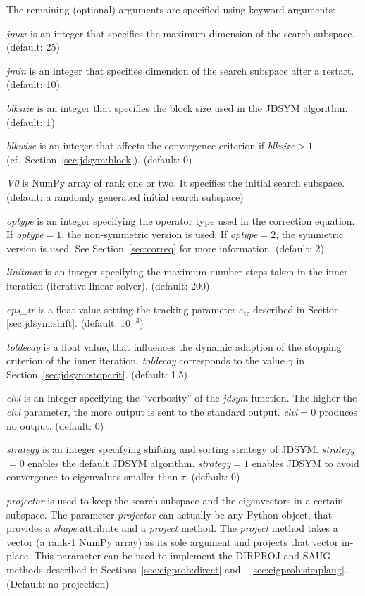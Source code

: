 \documentclass[a4paper]{article}
\newcommand{\epstr}{\ensuremath{\varepsilon_{\text{tr}}}}
\newenvironment{arglist} {\begin{list}{}{\setlength{\leftmargin}{4em}\setlength{\itemsep}{0cm}\setlength{\labelwidth}{3em}}}
  {\end{list}}
\begin{document}
\noindent The remaining (optional) arguments are specified using keyword
arguments:
\begin{arglist}
\item[\textit{jmax}] is an integer that specifies the maximum
  dimension of the search subspace. (default: 25)
\item[\textit{jmin}] is an integer that specifies dimension of the
  search subspace after a restart. (default: 10)
\item[\textit{blksize}] is an integer that specifies the block size
  used in the JDSYM algorithm. (default: 1)
\item[\textit{blkwise}] is an integer that affects the convergence
  criterion if \textit{blksize}${}>1$ (cf.\ 
  Section~\ref{sec:jdsym:block}). (default: 0)
\item[\textit{V0}] is NumPy array of rank one or two. It specifies the
  initial search subspace. (default: a randomly generated initial
  search subspace)
\item[\textit{optype}] is an integer specifying the operator type used
  in the correction equation. If \textit{optype}${}=1$, the
  non-symmetric version is used. If \textit{optype}${}=2$, the
  symmetric version is used. See Section~\ref{sec:correq} for more
  information. (default: 2)
\item[\textit{linitmax}] is an integer specifying the maximum number
  steps taken in the inner iteration (iterative linear solver).
  (default: 200)
\item[\textit{eps\_tr}] is a float value setting the tracking
  parameter $\epstr$ described in Section \ref{sec:jdsym:shift}.
  (default: $10^{-3}$)
\item[\textit{toldecay}] is a float value, that influences the dynamic
  adaption of the stopping criterion of the inner iteration.
  \textit{toldecay} corresponds to the value $\gamma$ in
  Section~\ref{sec:jdsym:stopcrit}. (default: 1.5)
\item[\textit{clvl}] is an integer specifying the ``verbosity'' of the
  \textit{jdsym} function. The higher the \textit{clvl} parameter, the
  more output is sent to the standard output. \textit{clvl}${}=0$
  produces no output. (default: 0)
\item[\textit{strategy}] is an integer specifying shifting and sorting
  strategy of JDSYM. \textit{strategy}${}=0$ enables the default JDSYM
  algorithm. \textit{strategy}${}=1$ enables JDSYM to avoid
  convergence to eigenvalues smaller than $\tau$. (default: 0)
\item[\textit{projector}] is used to keep the search subspace and the
  eigenvectors in a certain subspace. The parameter \textit{projector}
  can actually be any Python object, that provides a \textit{shape}
  attribute and a \textit{project} method. The \textit{project} method
  takes a vector (a rank-1 NumPy array) as its sole argument and
  projects that vector in-place. This parameter can be used to
  implement the DIRPROJ and SAUG methods described in
  Sections~\ref{sec:eigprob:direct} and~~\ref{sec:eigprob:simplaug}.
  (Default: no projection)
\end{arglist}
\end{document}
